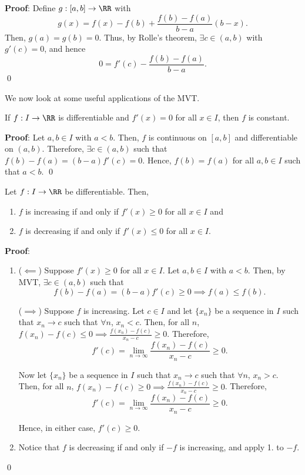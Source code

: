 \textbf{Proof}: Define $g:[a,b]\to \RR$ with
\[
g(x) = f(x) - f(b) + \frac{f(b)-f(a)}{b-a}(b-x).
\]
Then, $g(a) = g(b) = 0$. Thus, by Rolle's theorem, $\exists c\in (a,b)$ with $g'(c) = 0$, and hence 
\[
0 = f'(c) - \frac{f(b)-f(a)}{b-a}.
\]\qed 

We now look at some useful applications of the MVT.

\begin{theorem}
If $f:I\to \RR$ is differentiable and $f'(x) = 0$ for all $x\in I$, then $f$ is constant.
\end{theorem}
\textbf{Proof}: Let $a,b\in I$ with $a<b$. Then, $f$ is continuous on $[a,b]$ and differentiable on $(a,b)$. Therefore, $\exists c\in (a,b)$ such that $f(b) -f(a) = (b-a) f'(c) = 0$. Hence, $f(b) = f(a)$ for all $a,b\in I$ such that $a<b$. \qed 

\begin{theorem}
Let $f:I\to \RR$ be differentiable. Then,
\begin{enumerate}
    \item $f$ is increasing if and only if $f'(x) \geq 0$ for all $x\in I$ and
    \item $f$ is decreasing if and only if $f'(x) \leq 0$ for all $x\in I.$ 
\end{enumerate}
\end{theorem}
\textbf{Proof}:
\begin{enumerate}
    \item ($\impliedby$) Suppose $f'(x) \geq 0$ for all $x\in I$. Let $a,b\in I$ with $a<b$. Then, by MVT, $\exists c\in (a,b)$ such that 
    \[
    f(b)-f(a) = (b-a)f'(c) \geq 0 \implies f(a) \leq f(b).
    \]
    
    ($\implies$) Suppose $f$ is increasing. Let $c\in I$ and let $\{x_n\}$ be a sequence in $I$ such that $x_n\to c$ such that $\forall n$, $x_n< c$. Then, for all $n$, $f(x_n) - f(c) \leq 0 \implies \frac{f(x_n) - f(c)}{x_n-c}\geq 0$. Therefore, \[
    f'(c) = \lim_{n\to \infty} \frac{f(x_n) - f(c)}{x_n-c} \geq 0.
    \]
    
    Now let $\{x_n\}$ be a sequence in $I$ such that $x_n\to c$ such that $\forall n$, $x_n> c$. Then, for all $n$, $f(x_n) - f(c) \geq 0 \implies \frac{f(x_n) - f(c)}{x_n-c}\geq 0$. Therefore, \[
    f'(c) = \lim_{n\to \infty} \frac{f(x_n) - f(c)}{x_n-c} \geq 0.
    \]
    
    Hence, in either case, $f'(c) \geq 0$.
    
    \item Notice that $f$ is decreasing if and only if $-f$ is increasing, and apply 1. to $-f$.
\end{enumerate} \qed

